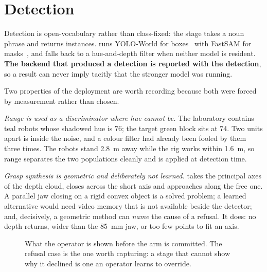 \section{Detection}

Detection is open-vocabulary rather than class-fixed: the stage takes a noun
phrase and returns instances.  runs
YOLO-World for boxes~\cite{cheng2024yoloworld} with FastSAM for
masks~\cite{zhao2023fastsam}, and falls back to a hue-and-depth filter when
neither model is resident. \textbf{The backend that produced a detection is
reported with the detection}, so a result can never imply tacitly that the
stronger model was running.

Two properties of the deployment are worth recording because both were forced
by measurement rather than chosen.

\emph{Range is used as a discriminator where hue cannot be.} The laboratory
contains teal robots whose shadowed hue is \num{76}; the target green block
sits at \num{74}. Two units apart is inside the noise, and a colour filter had
already been fooled by them three times. The robots stand \SI{2.8}{\metre}
away while the rig works within \SI{1.6}{\metre}, so range separates the two
populations cleanly and is applied at detection time.

\emph{Grasp synthesis is geometric and deliberately not learned.}
 takes the principal axes of the depth
cloud, closes across the short axis and approaches along the free one. A
parallel jaw closing on a rigid convex object is a solved problem; a learned
alternative would need video memory that is not available beside the detector;
and, decisively, a geometric method can \emph{name} the cause of a refusal. It
does: no depth returns, wider than the \SI{85}{\milli\metre} jaw, or too few
points to fit an axis.

\begin{figure}[htbp]
  \centering
  \caption[Detection and grasp synthesis]{What the operator is shown before
  the arm is committed. The refusal case is the one worth capturing: a stage
  that cannot show why it declined is one an operator learns to override.}
  \label{fig:detect}
\end{figure}

